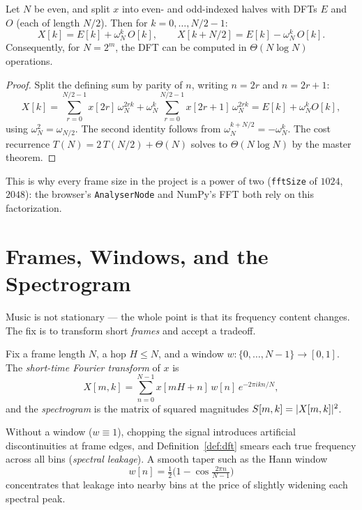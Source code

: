 \begin{theorem}\label{thm:fft}
Let $N$ be even, and split $x$ into even- and odd-indexed halves with DFTs
$E$ and $O$ (each of length $N/2$). Then for $k = 0, \dots, N/2 - 1$:
\[
X[k] = E[k] + \omega_N^{k}\, O[k], \qquad
X[k + N/2] = E[k] - \omega_N^{k}\, O[k].
\]
Consequently, for $N = 2^m$, the DFT can be computed in
$\Theta(N \log N)$ operations.
\end{theorem}

\begin{proof}
Split the defining sum by parity of $n$, writing $n = 2r$ and $n = 2r + 1$:
\[
X[k] = \sum_{r=0}^{N/2-1} x[2r]\, \omega_N^{2rk}
     + \omega_N^{k} \sum_{r=0}^{N/2-1} x[2r+1]\, \omega_N^{2rk}
     = E[k] + \omega_N^k O[k],
\]
using $\omega_N^2 = \omega_{N/2}$. The second identity follows from
$\omega_N^{k + N/2} = -\omega_N^{k}$. The cost recurrence
$T(N) = 2\,T(N/2) + \Theta(N)$ solves to $\Theta(N \log N)$ by the master
theorem.
\end{proof}

This is why every frame size in the project is a power of two
(\texttt{fftSize} of $1024$, $2048$): the browser's
\texttt{AnalyserNode} and NumPy's FFT both rely on this factorization.

\section{Frames, Windows, and the Spectrogram}

Music is not stationary --- the whole point is that its frequency content
changes. The fix is to transform short \emph{frames} and accept a tradeoff.

\begin{definition}\label{def:stft}
Fix a frame length $N$, a hop $H \le N$, and a window
$w : \{0,\dots,N-1\} \to [0,1]$. The \emph{short-time Fourier transform} of
$x$ is
\[
X[m, k] = \sum_{n=0}^{N-1} x[mH + n]\, w[n]\, e^{-2\pi i k n / N},
\]
and the \emph{spectrogram} is the matrix of squared magnitudes
$S[m,k] = \lvert X[m,k]\rvert^2$.
\end{definition}

Without a window ($w \equiv 1$), chopping the signal introduces artificial
discontinuities at frame edges, and Definition~\ref{def:dft} smears each true
frequency across all bins (\emph{spectral leakage}). A smooth taper such as
the Hann window
\[
w[n] = \tfrac{1}{2}\Big(1 - \cos\tfrac{2\pi n}{N-1}\Big)
\]
concentrates that leakage into nearby bins at the price of slightly widening
each spectral peak.

